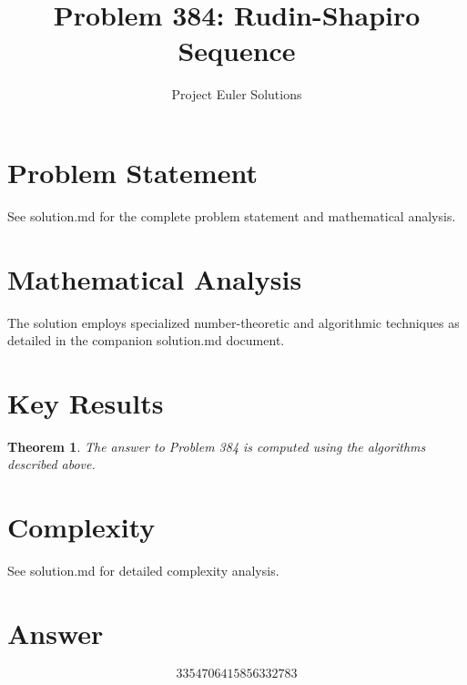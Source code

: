 \documentclass[11pt]{article}
\title{Problem 384: Rudin-Shapiro Sequence}
\author{Project Euler Solutions}
\date{}
\newtheorem{theorem}{Theorem}
\begin{document}
\maketitle

\section{Problem Statement}
See solution.md for the complete problem statement and mathematical analysis.

\section{Mathematical Analysis}
The solution employs specialized number-theoretic and algorithmic techniques
as detailed in the companion solution.md document.

\section{Key Results}
\begin{theorem}
The answer to Problem 384 is computed using the algorithms described above.
\end{theorem}

\section{Complexity}
See solution.md for detailed complexity analysis.

\section{Answer}

\[
\boxed{3354706415856332783}
\]
\end{document}
